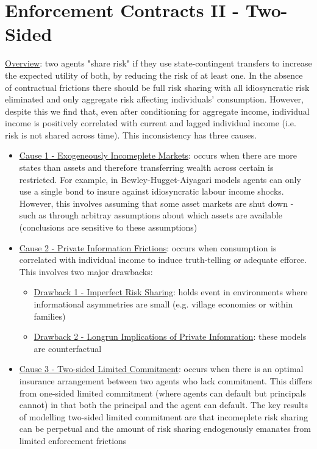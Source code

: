 \documentclass{article}
\begin{document}
\begin{itemize}
\end{itemize}

\newpage

\section{Enforcement Contracts II - Two-Sided}

\vspace{2.5mm}
\par \underline{Overview}: two agents "share risk" if they use state-contingent transfers to increase the expected utility of both, by reducing the risk of at least one. In the absence of contractual frictions there should be full risk sharing with all idiosyncratic risk eliminated and only aggregate risk affecting individuals' consumption. However, despite this we find that, even after conditioning for aggregate income, individual income is positively correlated with current and lagged individual income (i.e. risk is not shared across time). This inconsistency has three causes.
\begin{itemize}
    \item  \underline{Cause 1 - Exogeneously Incomeplete Markets}: occurs when there are more states than assets and therefore transferring wealth across certain is restricted. For example, in Bewley-Hugget-Aiyagari models agents can only use a single bond to insure against idiosyncratic labour income shocks. However, this involves assuming that some asset markets are shut down - such as through arbitray assumptions about which assets are available (conclusions are sensitive to these assumptions)
    \item  \underline{Cause 2 - Private Information Frictions}: occurs when consumption is correlated with individual income to induce truth-telling or adequate efforce. This involves two major drawbacks:
    \begin{itemize}
        \item  \underline{Drawback 1 - Imperfect Risk Sharing}: holds event in environments where informational asymmetries are small (e.g. village economies or within families)
        \item  \underline{Drawback 2 - Longrun Implications of Private Infomration}: these models are counterfactual
    \end{itemize}
    \item  \underline{Cause 3 - Two-sided Limited Commitment}: occurs when there is an optimal insurance arrangement between two agents who lack commitment. This differs from one-sided limited commitment (where agents can default but principals cannot) in that both the principal and the agent can default. The key results of modelling two-sided limited commitment are that incomeplete risk sharing can be perpetual and the amount of risk sharing endogenously emanates from limited enforcement frictions
\end{itemize}
\end{document}
